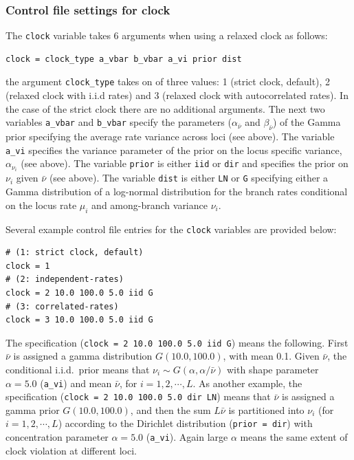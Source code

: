 \documentclass[a4paper]{book}
\numberwithin{equation}{section} \renewcommand{\baselinestretch}{0.55}
\begin{document}
\subsubsection{Control file settings for clock}
The \texttt{clock} variable takes 6 arguments when using a relaxed
clock as follows:
\begin{verbatim}
clock = clock_type a_vbar b_vbar a_vi prior dist
\end{verbatim}
the argument \texttt{clock\_type} takes on of three values: 1 (strict
clock, default), 2 (relaxed clock with i.i.d rates) and 3 (relaxed
clock with autocorrelated rates).  In the case of the strict clock
there are no additional arguments. The next two variables
\texttt{a\_vbar} and \texttt{b\_vbar} specify the parameters
($\alpha_{\bar{\nu}}$ and $\beta_{\bar{\nu}}$) of the Gamma prior
specifying the average rate variance across loci (see above).  The
variable \texttt{a\_vi} specifies the variance parameter of the prior
on the locus specific variance, $\alpha_{\nu_i}$ (see above). The
variable \texttt{prior} is either \texttt{iid} or \texttt{dir} and
specifies the prior on $\nu_i$ given $\bar{\nu}$ (see above). The
variable \texttt{dist} is either \texttt{LN} or \texttt{G} specifying
either a Gamma distribution of a log-normal distribution for the
branch rates conditional on the locus rate $\mu_i$ and among-branch
variance $\nu_i$.

Several example control file entries for the \texttt{clock} variables
are provided below:
\begin{verbatim}
# (1: strict clock, default)
clock = 1 
# (2: independent-rates)
clock = 2 10.0 100.0 5.0 iid G
# (3: correlated-rates)
clock = 3 10.0 100.0 5.0 iid G
\end{verbatim}
The specification (\texttt{clock = 2 10.0 100.0 5.0 iid G}) means the
following.  First $\bar\nu$ is assigned a gamma distribution
$G(10.0, 100.0)$, with mean 0.1.  Given $\bar\nu$, the conditional
i.i.d.\ prior means that $\nu_i \sim G(\alpha, \alpha/\bar\nu)$ with
shape parameter $\alpha = 5.0 $ (\texttt{a\_vi}) and mean $\bar\nu$,
for $i = 1, 2, \cdots, L$.  As another example, the specification
(\texttt{clock = 2 10.0 100.0 5.0 dir LN}) means that $\bar\nu$ is
assigned a gamma prior $G(10.0, 100.0)$, and then the sum $L\bar\nu$
is partitioned into $\nu_i$ (for $i = 1, 2, \cdots, L$) according to
the Dirichlet distribution (\texttt{prior = dir}) with concentration
parameter $\alpha = 5.0$ (\texttt{a\_vi}).  Again large $\alpha$ means
the same extent of clock violation at different loci.
\end{document}
